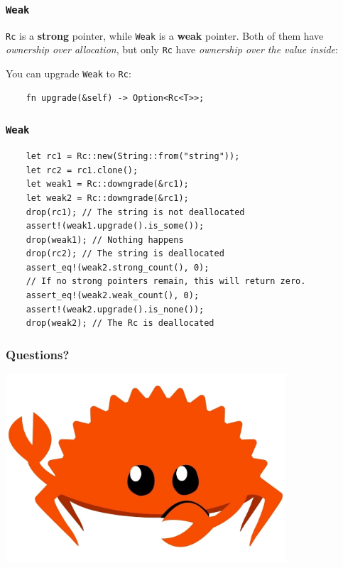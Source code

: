 \documentclass[aspectratio=1610,t]{beamer}
\begin{document}

\begin{frame}[fragile]
\frametitle{\texttt{Weak}}
\texttt{Rc} is a \textbf{strong} pointer, while \texttt{Weak} is a \textbf{weak} pointer. Both of them have \textit{ownership over allocation}, but only \texttt{Rc} have \textit{ownership over the value inside}:

You can upgrade \texttt{Weak} to \texttt{Rc}:

\begin{verbatim}
    fn upgrade(&self) -> Option<Rc<T>>;
\end{verbatim}
\end{frame}


\begin{frame}[fragile,c]
\frametitle{\texttt{Weak}}
\begin{verbatim}
    let rc1 = Rc::new(String::from("string"));
    let rc2 = rc1.clone();
    let weak1 = Rc::downgrade(&rc1);
    let weak2 = Rc::downgrade(&rc1);
    drop(rc1); // The string is not deallocated
    assert!(weak1.upgrade().is_some());
    drop(weak1); // Nothing happens
    drop(rc2); // The string is deallocated
    assert_eq!(weak2.strong_count(), 0);
    // If no strong pointers remain, this will return zero.
    assert_eq!(weak2.weak_count(), 0);
    assert!(weak2.upgrade().is_none());
    drop(weak2); // The Rc is deallocated
\end{verbatim}
\end{frame}


\begin{frame}
\frametitle{Questions?}
\begin{center}
\includegraphics[width=\textwidth,height=7cm,keepaspectratio]{images/crab.jpg}
\end{center}
\end{frame}

\end{document}
